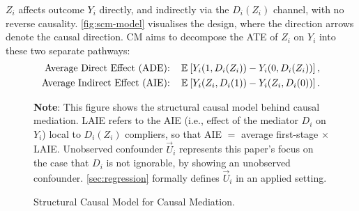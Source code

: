 $Z_i$ affects outcome $Y_i$ directly, and indirectly via the $D_i(Z_i)$ channel, with no reverse causality.
\autoref{fig:scm-model} visualises the design, where the direction arrows denote the causal direction.
CM aims to decompose the ATE of $Z_i$ on $Y_i$ into these two separate pathways:
\begin{align*}
    \text{Average Direct Effect (ADE): } \;\;\;&
        \mathbb{E}_{} \left[ Y_i(1, D_i(Z_i)) - Y_i(0, D_i(Z_i)) \right], \\
    \text{Average Indirect Effect (AIE): } \;\;\;&
            \mathbb{E}_{} \left[ Y_i(Z_i, D_i(1)) - Y_i(Z_i, D_i(0)) \right].
\end{align*}

\begin{figure}[h!]
    \centering
    \singlespacing
    \caption{Structural Causal Model for Causal Mediation.}
    \label{fig:scm-model}
    \justify
    \footnotesize
    \textbf{Note}:
    This figure shows the structural causal model behind causal mediation.
    LAIE refers to the AIE (i.e., effect of the mediator $D_i$ on $Y_i$) local to $D_i(Z_i)$ compliers, so that AIE $=$ average first-stage $\times$ LAIE.
    Unobserved confounder $\vec U_i$ represents this paper's focus on the case that $D_i$ is not ignorable, by showing an unobserved confounder.
    \autoref{sec:regression} formally defines $\vec U_i$ in an applied setting.
\end{figure}

